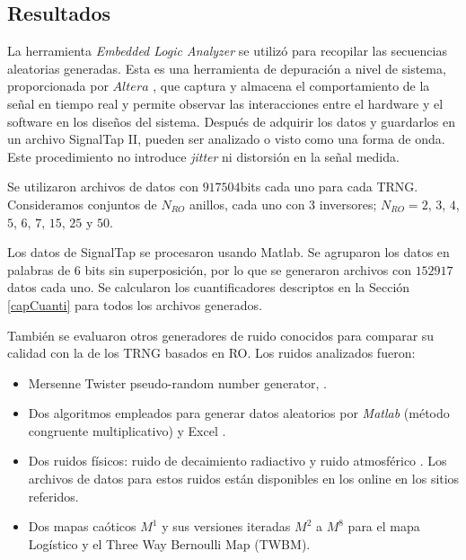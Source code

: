 \subsection{Resultados}
\label{sec:results}

La herramienta \emph{Embedded Logic Analyzer} se utilizó para recopilar las secuencias aleatorias generadas.
Esta es una {herramienta de depuración a nivel de sistema}, proporcionada por $ Altera $ \cite{QUARTUS}, que captura y almacena el comportamiento de la señal en tiempo real y permite observar las interacciones entre el hardware y el software en los diseños del sistema.
Después de adquirir los datos y guardarlos en un archivo {SignalTap II}, pueden ser analizado o visto como una forma de onda.
Este procedimiento no introduce \textit{jitter} ni distorsión en la señal medida.

Se utilizaron archivos de datos con $917504$bits cada uno para cada {TRNG}.
Consideramos conjuntos de $N_ {RO}$ anillos, cada uno con $3$ inversores; $N_{RO}=2$, $3$, $4$, $5$, $6$, $7$, $15$, $25$ y $50$.

Los datos de SignalTap se procesaron usando {Matlab}.
Se agruparon los datos en palabras de $6$ bits sin superposición, por lo que se generaron archivos con $152917$ datos cada uno.
Se calcularon los cuantificadores descriptos en la Sección \ref{capCuanti} para todos los archivos generados.

También se evaluaron otros generadores de ruido conocidos para comparar su calidad con la de los {TRNG} basados en {RO}.
Los ruidos analizados fueron:

\begin{itemize}
  \item Mersenne Twister pseudo-random number generator, \cite{Matsumoto1998}.
  \item Dos algoritmos empleados para generar datos aleatorios por \textit{Matlab} (método congruente multiplicativo) y Excel \cite{McLeod1985}.
  \item Dos {ruidos físicos}: ruido de decaimiento radiactivo \cite{Walker2001} y ruido atmosférico \cite{Haahr}.
  Los archivos de datos para estos ruidos están disponibles en los online en los sitios referidos.
  \item Dos mapas caóticos $M^1$ y sus versiones iteradas $M^2$ a $M^8$ \cite{DeMicco2008} para el mapa Logístico y el {Three Way Bernoulli Map} ({TWBM}).
\end{itemize}

